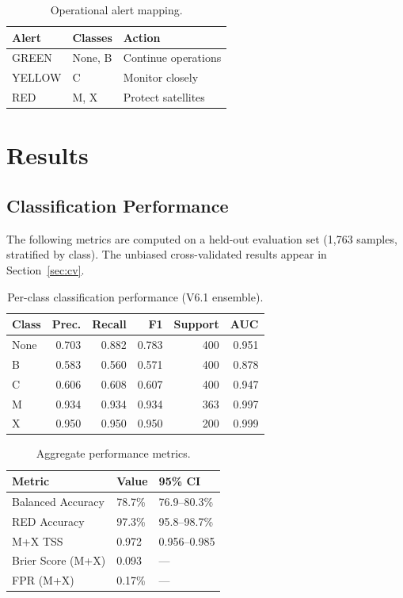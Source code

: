 \documentclass[twocolumn,10pt]{article}
\begin{document}
\begin{table}[htbp]
\centering
\caption{Operational alert mapping.}
\label{tab:alerts}
\footnotesize
\begin{tabular}{@{}lll@{}}
\toprule
Alert & Classes & Action \\
\midrule
GREEN & None, B & Continue operations \\
YELLOW & C & Monitor closely \\
RED & M, X & Protect satellites \\
\bottomrule
\end{tabular}
\end{table}


\section{Results}\label{sec:results}

\subsection{Classification Performance}\label{sec:perf}

The following metrics are computed on a held-out evaluation set (1,763 samples, stratified by class). The unbiased cross-validated results appear in Section~\ref{sec:cv}.

\begin{table}[htbp]
\centering
\caption{Per-class classification performance (V6.1 ensemble).}
\label{tab:perclass}
\footnotesize
\begin{tabular}{@{}lrrrrr@{}}
\toprule
Class & Prec. & Recall & F1 & Support & AUC \\
\midrule
None & 0.703 & 0.882 & 0.783 & 400 & 0.951 \\
B & 0.583 & 0.560 & 0.571 & 400 & 0.878 \\
C & 0.606 & 0.608 & 0.607 & 400 & 0.947 \\
M & 0.934 & 0.934 & 0.934 & 363 & 0.997 \\
X & 0.950 & 0.950 & 0.950 & 200 & 0.999 \\
\bottomrule
\end{tabular}
\end{table}

\begin{table}[htbp]
\centering
\caption{Aggregate performance metrics.}
\label{tab:aggregate}
\footnotesize
\begin{tabular}{@{}lll@{}}
\toprule
Metric & Value & 95\% CI \\
\midrule
Balanced Accuracy & 78.7\% & 76.9--80.3\% \\
RED Accuracy & 97.3\% & 95.8--98.7\% \\
M+X TSS & 0.972 & 0.956--0.985 \\
Brier Score (M+X) & 0.093 & --- \\
FPR (M+X) & 0.17\% & --- \\
\bottomrule
\end{tabular}
\end{table}
\end{document}
